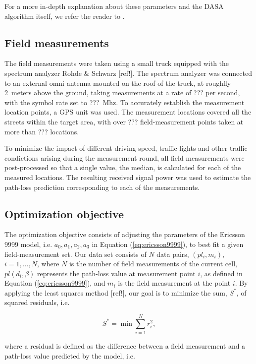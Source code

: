 For a more in-depth explanation about these parameters and the DASA
algorithm itself, we refer the reader to \cite{korosec2010_DASA}.


\subsection{Field measurements}

The field measurements were taken using a small truck equipped with
the spectrum analyzer Rohde \& Schwarz {[}ref!{]}. The spectrum analyzer
was connected to an external omni antenna mounted on the roof of the
truck, at roughfly 2~meters above the ground, taking measurements
at a rate of ??? per second, with the symbol rate set to ???~Mhz.
To accurately establish the measurement location points, a GPS unit
was used. The measurement locations covered all the streets within
the target area, with over ??? field-measurement points taken at more
than ??? locations. 

To minimize the impact of different driving speed, traffic lights
and other traffic condictions arising during the measurement round,
all field measurements were post-processed so that a single value,
the median, is calculated for each of the measured locations. The
resulting received signal power was used to estimate the path-loss
prediction corresponding to each of the measurements.


\subsection{Optimization objective}

The optimization objective consists of adjusting the parameters of
the Ericsson 9999 model, i.e. $a_{0},a_{1},a_{2},a_{3}$ in Equation
(\ref{eq:ericsson9999}), to best fit a given field-measurement set.
Our data set consists of $N$ data pairs, $(pl_{i},m_{i})$, $i=1,\ldots,N$,
where $N$ is the number of field measurements of the current cell,
$pl(d_{i},\beta)$ represents the path-loss value at measurement point
$i$, as defined in Equation (\ref{eq:ericsson9999}), and $m_{i}$
is the field measurement at the point $i$. By applying the least
squares method {[}ref!{]}, our goal is to minimize the sum, $S^{*}$,
of squared residuals, i.e.

\begin{equation}
S^{*}=\min\sum_{i=1}^{N}r_{i}^{2},\label{eq:cost_function}
\end{equation}


where a residual is defined as the difference between a field measurement
and a path-loss value predicted by the model, i.e.

